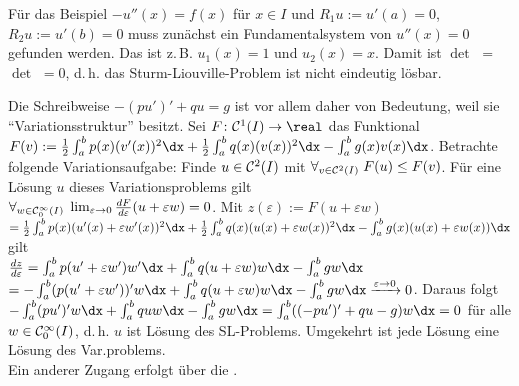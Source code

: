 \begin{Bsp}
    Für das Beispiel $-u''(x) = f(x)$ für $x \in I$ und
    $R_1 u := u'(a) = 0$, $R_2 u := u'(b) = 0$ muss zunächst ein
    Fundamentalsystem von $u''(x) = 0$ gefunden werden.
    Das ist z.\,B. $u_1(x) = 1$ und $u_2(x) = x$.
    Damit ist $\det$ $=$
    $\det$ $= 0$,
    d.\,h. das Sturm-Liouville-Problem ist nicht eindeutig lösbar.
\end{Bsp}

\linie

\begin{Bem}
    Die Schreibweise $-(pu')' + qu = g$ ist vor allem daher von Bedeutung,
    weil sie "`Variationsstruktur"' besitzt.
    Sei $F\colon \C^1(I) \rightarrow \real$ das Funktional
    $F(v) := \frac{1}{2} \int_a^b p(x) (v'(x))^2 \dx +
    \frac{1}{2} \int_a^b q(x) (v(x))^2 \dx - \int_a^b g(x) v(x) \dx$.
    Betrachte folgende Variationsaufgabe:
    Finde $u \in \mathcal{C}^2(I)$ mit $\forall_{v \in \mathcal{C}^2(I)}\; F(u) \le F(v)$.
    Für eine Lösung $u$ dieses Variationsproblems gilt\\
    $\forall_{w \in \mathcal{C}_0^\infty(I)}\;
    \lim_{\varepsilon \to 0} \frac{dF}{d\varepsilon}(u + \varepsilon w) = 0$.
    Mit $z(\varepsilon) := F(u + \varepsilon w)$\\
    $= \frac{1}{2} \int_a^b p(x) (u'(x) + \varepsilon w'(x))^2 \dx +
    \frac{1}{2} \int_a^b q(x) (u(x) + \varepsilon w(x))^2 \dx -
    \int_a^b g(x) (u(x) + \varepsilon w(x)) \dx$ gilt\\
    $\frac{dz}{d\varepsilon} =
    \int_a^b p (u' + \varepsilon w') w' \dx +
    \int_a^b q (u + \varepsilon w) w \dx - \int_a^b g w \dx$\\
    $= -\int_a^b (p (u' + \varepsilon w'))' w \dx +
    \int_a^b q (u + \varepsilon w) w \dx - \int_a^b g w \dx
    \xrightarrow{\varepsilon \to 0} 0$.
    Daraus folgt\\
    $-\int_a^b (p u')' w \dx +
    \int_a^b q u w \dx - \int_a^b g w \dx =
    \int_a^b ((-p u')' + q u - g) w \dx = 0$ für alle $w \in \mathcal{C}_0^\infty(I)$,
    d.\,h. $u$ ist Lösung des SL-Problems.
    Umgekehrt ist jede Lösung eine Lösung des Var.problems.\\
    Ein anderer Zugang erfolgt über die
    .
\end{Bem}

